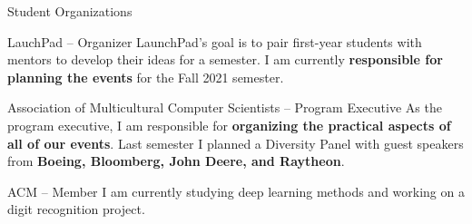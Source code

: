 \documentclass{article}
\newlength{\tabin}
\newlength{\secsep}
\newcommand{\lineunder}{\vspace*{-8pt} \\ \hspace*{-6pt} \hrulefill \\ \vspace*{-15pt}}
\newenvironment{tabbedsection}[1]{
  \begin{list}{}{
      \setlength{\itemsep}{0pt}
      \setlength{\labelsep}{0pt}
      \setlength{\labelwidth}{0pt}
      \setlength{\leftmargin}{\tabin}
      \setlength{\rightmargin}{\tabin}
      \setlength{\listparindent}{0pt}
      \setlength{\parsep}{0pt}
      \setlength{\parskip}{0pt}
      \setlength{\partopsep}{0pt}
      \setlength{\topsep}{#1}
    }
  \item[]
}{\end{list}}
\newenvironment{resume_section}[1]{
  \filbreak
  \vspace{2\secsep}
  \textsc{\large#1}
  \lineunder
  \begin{tabbedsection}{\secsep}
}{\end{tabbedsection}}
\newenvironment{resume_subsection}[2][]{
  \textbf{#2} \hfill {\footnotesize #1} \hspace{2em}
  \begin{tabbedsection}{0.5\secsep}
}{\end{tabbedsection}}
\begin{document}
\begin{resume_section}{Student Organizations}

	\begin{resume_subsection}{LauchPad -- Organizer}
		LaunchPad's goal is to pair first-year students with mentors to develop their ideas for a semester. I am currently \textbf{responsible for planning the events} for the Fall 2021 semester.
	\end{resume_subsection}
	
	\begin{resume_subsection}{Association of Multicultural Computer Scientists -- Program Executive}
		As the program executive, I am responsible for\textbf{ organizing the practical aspects of all of our events}. Last semester I planned a Diversity Panel with guest speakers from \textbf{Boeing, Bloomberg, John Deere, and Raytheon}.
	\end{resume_subsection} 
	
	\begin{resume_subsection}{ACM -- Member}
		I am currently studying deep learning methods and working on a digit recognition project.
	\end{resume_subsection}
	
\end{resume_section}
\end{document}
